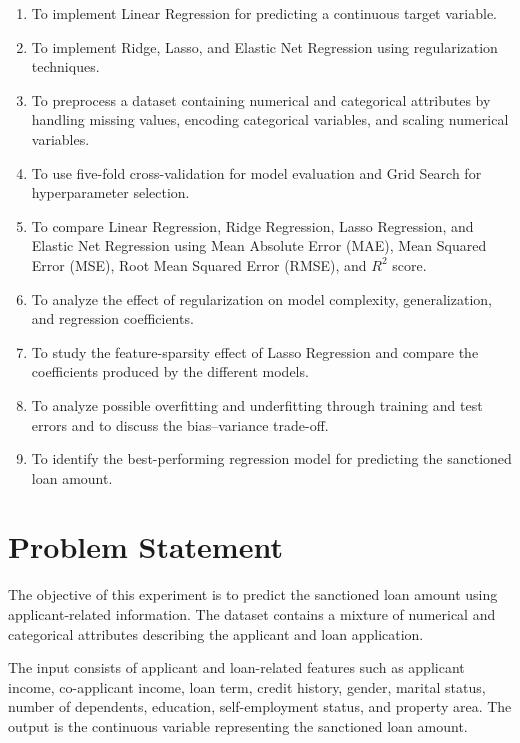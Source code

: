 \documentclass[12pt,a4paper]{article}
\begin{document}
\begin{enumerate}[label=\arabic*.]
    \item To implement Linear Regression for predicting a continuous target variable.
    \item To implement Ridge, Lasso, and Elastic Net Regression using regularization techniques.
    \item To preprocess a dataset containing numerical and categorical attributes by handling missing values, encoding categorical variables, and scaling numerical variables.
    \item To use five-fold cross-validation for model evaluation and Grid Search for hyperparameter selection.
    \item To compare Linear Regression, Ridge Regression, Lasso Regression, and Elastic Net Regression using Mean Absolute Error (MAE), Mean Squared Error (MSE), Root Mean Squared Error (RMSE), and $R^2$ score.
    \item To analyze the effect of regularization on model complexity, generalization, and regression coefficients.
    \item To study the feature-sparsity effect of Lasso Regression and compare the coefficients produced by the different models.
    \item To analyze possible overfitting and underfitting through training and test errors and to discuss the bias--variance trade-off.
    \item To identify the best-performing regression model for predicting the sanctioned loan amount.
\end{enumerate}

\section{Problem Statement}

The objective of this experiment is to predict the sanctioned loan amount using applicant-related information. The dataset contains a mixture of numerical and categorical attributes describing the applicant and loan application.

The input consists of applicant and loan-related features such as applicant income, co-applicant income, loan term, credit history, gender, marital status, number of dependents, education, self-employment status, and property area. The output is the continuous variable representing the sanctioned loan amount.
\end{document}
